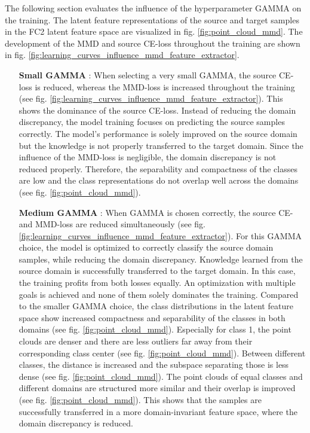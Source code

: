 The following section evaluates the influence of the hyperparameter GAMMA on the training. The latent feature representations of the source and target samples in the FC2 latent feature space are visualized in fig. \ref{fig:point_cloud_mmd}. The development of the MMD and source CE-loss throughout the training are shown in fig. \ref{fig:learning_curves_influence_mmd_feature_extractor}.
\begin{itemize}
    \item [\textbf{Small GAMMA}]:
    When selecting a very small GAMMA, the source CE-loss is reduced, whereas the MMD-loss is increased throughout the training (see fig. \ref{fig:learning_curves_influence_mmd_feature_extractor}). This shows the dominance of the source CE-loss. Instead of reducing the domain discrepancy, the model training focuses on predicting the source samples correctly. The model's performance is solely improved on the source domain but the knowledge is not properly transferred to the target domain. Since the influence of the MMD-loss is negligible, the domain discrepancy is not reduced properly. Therefore, the separability and compactness of the classes are low and the class representations do not overlap well across the domains (see fig. \ref{fig:point_cloud_mmd}).
    \item [\textbf{Medium GAMMA}]:
    When GAMMA is chosen correctly, the source CE- and MMD-loss are reduced simultaneously (see fig. \ref{fig:learning_curves_influence_mmd_feature_extractor}). For this GAMMA choice, the model is optimized to correctly classify the source domain samples, while reducing the domain discrepancy. Knowledge learned from the source domain is successfully transferred to the target domain. In this case, the training profits from both losses equally. An optimization with multiple goals is achieved and none of them solely dominates the training. Compared to the smaller GAMMA choice, the class distributions in the latent feature space show increased compactness and separability of the classes in both domains (see fig. \ref{fig:point_cloud_mmd}). Especially for class 1, the point clouds are denser and there are less outliers far away from their corresponding class center (see fig. \ref{fig:point_cloud_mmd}). Between different classes, the distance is increased and the subspace separating those is less dense (see fig. \ref{fig:point_cloud_mmd}). The point clouds of equal classes and different domains are structured more similar and their overlap is improved (see fig. \ref{fig:point_cloud_mmd}). This shows that the samples are successfully transferred in a more domain-invariant feature space, where the domain discrepancy is reduced.

\end{itemize}
